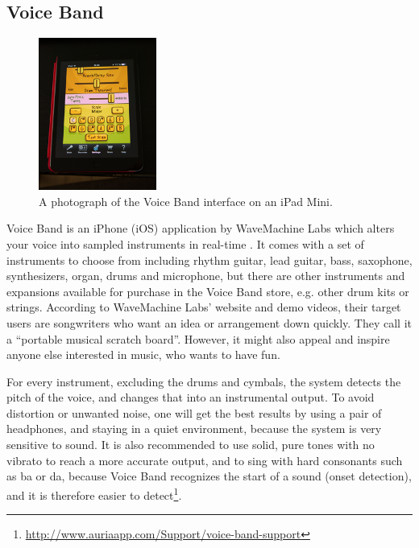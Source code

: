 \subsection{ Voice Band }
\begin{figure}[h]
	\begin{center}
		\includegraphics[height=5cm]{fig/voiceband.png}
		\caption{A photograph of the Voice Band interface on an iPad Mini.}
		\label{VoiceBand}
	\end{center}
\end{figure}

Voice Band is an iPhone (iOS) application by WaveMachine Labs which alters your voice into sampled instruments in real-time \citep{WML2013}. It comes with a set of instruments to choose from including rhythm guitar, lead guitar, bass, saxophone, synthesizers, organ, drums and microphone, but there are other instruments and expansions available for purchase in the Voice Band store, e.g. other drum kits or strings. According to WaveMachine Labs’ website and demo videos, their target users are songwriters who want an idea or arrangement down quickly. They call it a “portable musical scratch board”. However, it might also appeal and inspire anyone else interested in music, who wants to have fun.


For every instrument, excluding the drums and cymbals, the system detects the pitch of the voice, and changes that into an instrumental output. To avoid distortion or unwanted noise, one will get the best results by using a pair of headphones, and staying in a quiet environment, because the system is very sensitive to sound. It is also recommended to use solid, pure tones with no vibrato to reach a more accurate output, and to sing with hard consonants such as ba or da, because Voice Band recognizes the start of a sound (onset detection), and it is therefore easier to detect\footnote{\url{http://www.auriaapp.com/Support/voice-band-support}}. 

